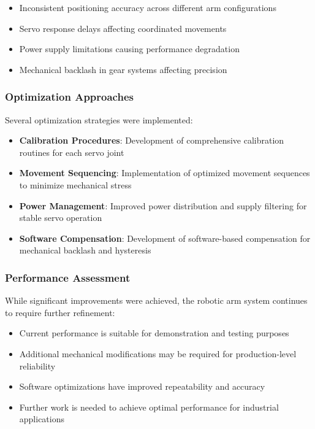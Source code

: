 \documentclass{book}
\begin{document}
\begin{itemize}
\item Inconsistent positioning accuracy across different arm configurations
\item Servo response delays affecting coordinated movements
\item Power supply limitations causing performance degradation
\item Mechanical backlash in gear systems affecting precision
\end{itemize}

\subsubsection{Optimization Approaches}
\par\noindent Several optimization strategies were implemented:

\begin{itemize}
\item \textbf{Calibration Procedures}: Development of comprehensive calibration routines for each servo joint
\item \textbf{Movement Sequencing}: Implementation of optimized movement sequences to minimize mechanical stress
\item \textbf{Power Management}: Improved power distribution and supply filtering for stable servo operation
\item \textbf{Software Compensation}: Development of software-based compensation for mechanical backlash and hysteresis
\end{itemize}

\subsubsection{Performance Assessment}
\par\noindent While significant improvements were achieved, the robotic arm system continues to require further refinement:

\begin{itemize}
\item Current performance is suitable for demonstration and testing purposes
\item Additional mechanical modifications may be required for production-level reliability
\item Software optimizations have improved repeatability and accuracy
\item Further work is needed to achieve optimal performance for industrial applications
\end{itemize}
\end{document}
